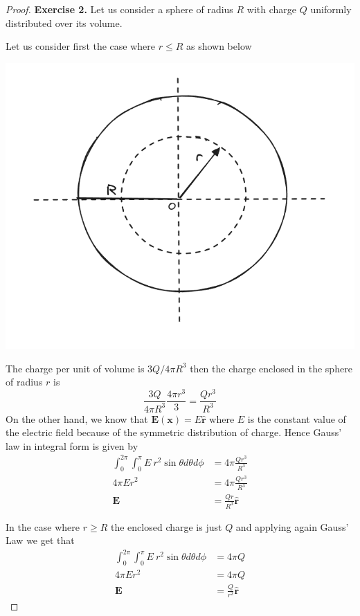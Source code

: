 \documentclass[11pt]{article}
\newcommand{\hatr}{\bm{\hat{r}}}
\theoremstyle{definition}
\begin{document}
\begin{proof}{\textbf{Exercise 2.}}
    Let us consider a sphere of radius $R$ with charge $Q$ uniformly
    distributed over its volume.
    
    Let us consider first the case where $r \leq R$ as shown below
    \begin{center}
        \includegraphics[scale=0.4]{ch2-ex2.png}
    \end{center}
    The charge per unit of volume is $3Q/4\pi R^3$ then the charge enclosed in
    the sphere of radius $r$ is
    $$\frac{3Q}{4\pi R^3} \frac{4\pi r^3}{3} = \frac{Qr^3}{R^3}$$
    On the other hand, we know that $\bm E(\bm{x}) = E\hatr$ where $E$ is the
    constant value of the electric field because of the symmetric distribution
    of charge.
    Hence Gauss' law in integral form is given by 
    \begin{align*}
        \int_{0}^{2\pi}\int_{0}^{\pi} E~r^2\sin\theta d\theta d\phi
        &= 4\pi\frac{Qr^3}{R^3}\\
        4\pi Er^2 &= 4\pi\frac{Qr^3}{R^3}\\
        \bm E &= \frac{Qr}{R^3}\hatr
    \end{align*}

    In the case where $r \geq R$ the enclosed charge is just $Q$ and applying
    again Gauss' Law we get that
    \begin{align*}
        \int_{0}^{2\pi}\int_{0}^{\pi} E~r^2\sin\theta d\theta d\phi
        &= 4\pi Q\\
        4\pi Er^2 &= 4\pi Q\\
        \bm E &= \frac{Q}{r^2}\hatr
    \end{align*}
\end{proof}
\end{document}

